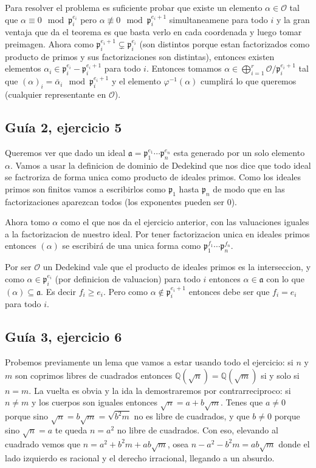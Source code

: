\documentclass[12pt]{amsart}
\newcommand{\QQ}{\mathbb{Q}}
\newcommand{\pp}{\mathfrak{p}}
\newcommand{\aaa}{\mathfrak{a}}
\newcommand{\OO}{\mathcal{O}}
\theoremstyle{plain}
\begin{document}
Para resolver el problema es suficiente probar que existe un elemento 
$\alpha \in \OO$ tal que $\alpha \equiv0\mod \pp_i^{e_i}$ pero 
$\alpha \not\equiv 0 \mod \pp_i^{e_i+1}$ 
simultaneamene para todo $i$ y la gran ventaja que da el teorema es que 
basta verlo en cada coordenada y luego tomar preimagen. Ahora como 
$\pp_i^{e_i+1} \subsetneq \pp_i^{e_i}$ (son distintos porque estan 
factorizados
como producto de primos y sus factorizaciones son distintas), entonces 
existen elementos $\alpha_i \in \pp_i^{e_i} - \pp_i^{e_i+1}$ para todo $i$.
Entonces tomamos $\alpha \in \bigoplus_{i=1}^r \OO / \pp_i^{e_i+1}$ tal que
$(\alpha)_i = \bar\alpha_i\mod \pp_i^{e_i+1}$ y el elemento $\varphi^{-1}
(\alpha)$ cumplirá lo que queremos (cualquier representante en $\OO$).


\subsection*{Guía 2, ejercicio 5}

Queremos ver que dado un ideal $\aaa = \pp_1^{e_1}\cdots\pp_n^{e_n}$ 
esta generado por un solo elemento $\alpha$. Vamos a usar la 
definicion de dominio de Dedekind que nos dice que todo ideal se 
factroriza de forma unica como producto de ideales primos.
Como los ideales primos son finitos vamos a escribirlos como $\pp_1$
hasta $\pp_n$ de modo que en las factorizaciones aparezcan todos (los
exponentes pueden ser $0$).

Ahora tomo $\alpha$ como el que nos da el ejercicio anterior, con las 
valuaciones iguales a la factorizacion de nuestro ideal. Por tener 
factorizacion unica en ideales primos entonces $(\alpha)$ se escribirá
de una unica forma como $\pp_1^{f_1}\cdots\pp_n^{f_n}$.

Por ser $\OO$ un Dedekind vale que el producto de ideales primos es la 
interseccion, y como $\alpha \in \pp_i^{e_i}$ (por definicion de valuacion)
para todo $i$ entonces $\alpha \in \aaa$ con lo que $(\alpha)\subseteq\aaa$.
Es decir $f_i\geq e_i$. Pero como $\alpha \notin \pp_i^{e_i+1}$ entonces 
debe ser que $f_i=e_i$ para todo $i$.


\subsection*{Guía 3, ejercicio 6}

Probemos previamente un lema que vamos a estar usando todo el ejercicio: si $n$ y $m$ son coprimos libres de cuadrados entonces $\QQ(\sqrt{n}) = \QQ(\sqrt{m})$ si y solo si $n=m$. La vuelta es obvia y la ida la demostraremos por contrarreciproco: si $n \neq m$ y los cuerpos son iguales entonces $\sqrt{n} = a+b\sqrt{m}$. Tenes que $a\neq 0$ porque sino $\sqrt{n} = b\sqrt{m} = \sqrt{b^2m}$ no es libre de cuadrados, y que $b\neq 0$ porque sino $\sqrt{n} = a$ te queda $n=a^2$ no libre de cuadrados. Con eso, elevando al cuadrado vemos que $n = a^2+b^2m+ab\sqrt{m}$, osea $n-a^2-b^2m = ab\sqrt{m}$ donde el lado izquierdo es racional y el derecho irracional, llegando a un absurdo.
\end{document}
